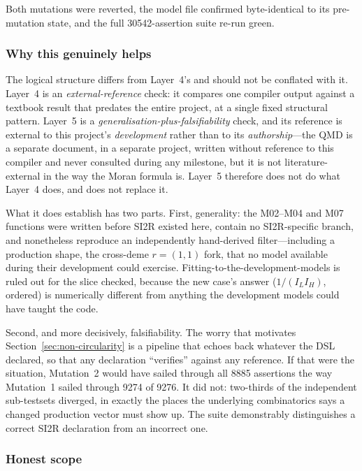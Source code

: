 \documentclass[11pt,leqno]{article}
\theoremstyle{plain}
\theoremstyle{definition}
\begin{document}
Both mutations were reverted, the model file confirmed byte-identical to its
pre-mutation state, and the full 30542-assertion suite re-run green.

\subsubsection{Why this genuinely helps}

The logical structure differs from Layer~4's and should not be conflated
with it.  Layer~4 is an \emph{external-reference} check: it compares one
compiler output against a textbook result that predates the entire project,
at a single fixed structural pattern.  Layer~5 is a
\emph{generalisation-plus-falsifiability} check, and its reference is
external to this project's \emph{development} rather than to its
\emph{authorship}---the QMD is a separate document, in a separate project,
written without reference to this compiler and never consulted during any
milestone, but it is not literature-external in the way the Moran formula
is.  Layer~5 therefore does not do what Layer~4 does, and does not replace
it.

What it does establish has two parts.  First, generality: the M02--M04 and
M07 functions were written before SI2R existed here, contain no
SI2R-specific branch, and nonetheless reproduce an independently
hand-derived filter---including a production shape, the cross-deme
$r = (1,1)$ fork, that no model available during their development could
exercise.  Fitting-to-the-development-models is ruled out for the slice
checked, because the new case's answer ($1/(I_L I_H)$, ordered) is
numerically different from anything the development models could have
taught the code.

Second, and more decisively, falsifiability.  The worry that motivates
Section~\ref{sec:non-circularity} is a pipeline that echoes back whatever
the DSL declared, so that any declaration ``verifies'' against any
reference.  If that were the situation, Mutation~2 would have sailed through
all 8885 assertions the way Mutation~1 sailed through 9274 of 9276.  It did
not: two-thirds of the independent sub-testsets diverged, in exactly the
places the underlying combinatorics says a changed production vector must
show up.  The suite demonstrably distinguishes a correct SI2R declaration
from an incorrect one.

\subsubsection{Honest scope}
\end{document}
